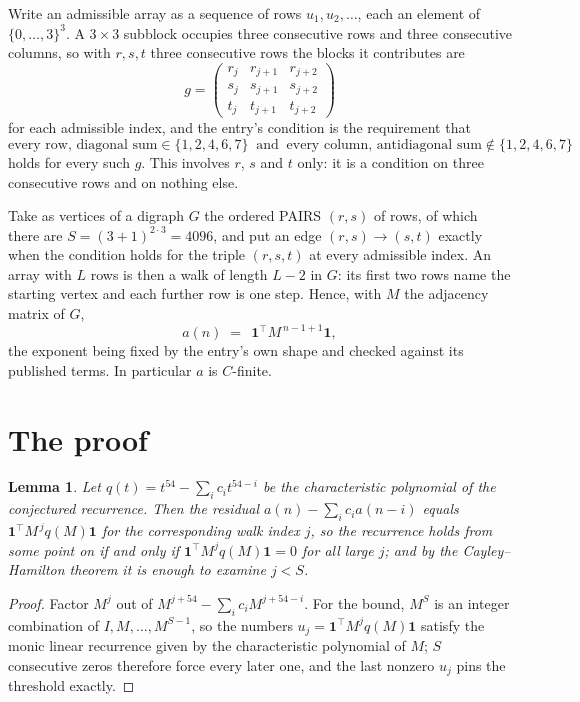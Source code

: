 \documentclass[11pt,a4paper]{article}
\theoremstyle{plain}
\newtheorem{lemma}[theorem]{Lemma}
\theoremstyle{definition}
\begin{document}
Write an admissible array as a sequence of rows $u_1,u_2,\dots$, each an element of
$\{0,\dots,3\}^{3}$. A $3\times3$ subblock occupies three consecutive rows and
three consecutive columns, so with $r,s,t$ three consecutive rows the blocks it
contributes are
\[
g=\begin{pmatrix}r_j&r_{j+1}&r_{j+2}\\ s_j&s_{j+1}&s_{j+2}\\ t_j&t_{j+1}&t_{j+2}\end{pmatrix}
\]
for each admissible index, and the entry's condition is the requirement that
\[
\text{every row, diagonal sum} \in \{1,2,4,6,7\}\ \text{ and }\ \text{every column, antidiagonal sum} \notin \{1,2,4,6,7\}
\]
holds for every such $g$. This involves $r$, $s$ and $t$ only: it is a condition on
three consecutive rows and on nothing else.

Take as vertices of a digraph $G$ the ordered PAIRS $(r,s)$ of rows, of which there are
$S=(3+1)^{2\cdot3}=4096$, and put an edge $(r,s)\to(s,t)$ exactly when the condition
holds for the triple $(r,s,t)$ at every admissible index. An array with $L$ rows is then a
walk of length $L-2$ in $G$: its first two rows name the starting vertex and each further
row is one step. Hence, with $M$ the adjacency matrix of $G$,
\[
a(n)\;=\;\,\mathbf{1}^{\!\top}M^{\,n-1+1}\mathbf{1},
\]
the exponent being fixed by the entry's own shape and checked against its published terms.
In particular $a$ is $C$-finite.

\section{The proof}

\begin{lemma}\label{lem:crit}
Let $q(t)=t^{54}-\sum_i c_it^{54-i}$ be the characteristic polynomial of the
conjectured recurrence. Then the residual $a(n)-\sum_ic_ia(n-i)$ equals
$\mathbf{1}^{\!\top}M^{\,j}q(M)\mathbf{1}$ for the corresponding walk index
$j$, so the recurrence holds from some point on if and only if
$\mathbf{1}^{\!\top}M^{j}q(M)\mathbf{1}=0$ for all large $j$; and by the
Cayley--Hamilton theorem it is enough to examine $j<S$.
\end{lemma}

\begin{proof}
Factor $M^{j}$ out of $M^{j+54}-\sum_ic_iM^{j+54-i}$. For the bound, $M^{S}$
is an integer combination of $I,M,\dots,M^{S-1}$, so the numbers
$u_j=\mathbf{1}^{\!\top}M^{j}q(M)\mathbf{1}$ satisfy the monic linear recurrence given by
the characteristic polynomial of $M$; $S$ consecutive zeros therefore force every later one,
and the last nonzero $u_j$ pins the threshold exactly.
\end{proof}
\end{document}
